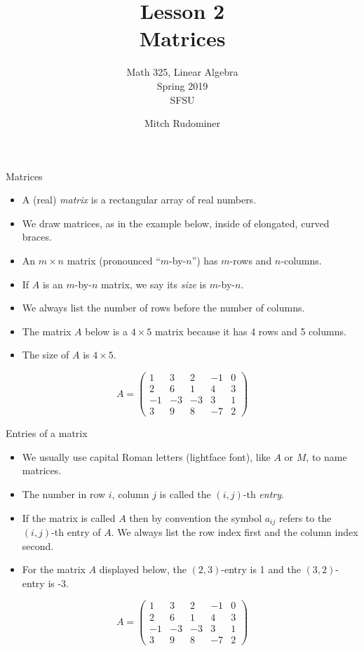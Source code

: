 \documentclass{beamer}
\title{Lesson 2 \\ Matrices}
\subtitle{Math 325, Linear Algebra \\ Spring 2019 \\ SFSU}
\author{Mitch Rudominer}
\date{}
\begin{document}
\begin{frame}
  \titlepage
\end{frame}



\begin{frame}{Matrices}

\begin{itemize}
\item A (real) \emph{matrix} is a rectangular array of real numbers.
\item We draw matrices, as in the example below, inside of elongated, curved
braces.
\item An $m\times n$ matrix (pronounced ``$m$-by-$n$'') has $m$-rows and $n$-columns.
\item If $A$ is an $m$-by-$n$ matrix, we say its \emph{size} is $m$-by-$n$.
\item We always list the number of rows before the number of columns.
\item The matrix $A$ below is a $4\times 5$ matrix because it has 4 rows
and 5 columns.
\item The size of $A$ is $4\times 5$.
\end{itemize}

$$
A =
\begin{pmatrix}
1 & 3 & 2 & -1 & 0 \\
2 & 6 & 1 & 4 & 3\\
-1 & -3 & -3 & 3 & 1 \\
3 & 9 & 8 & -7 & 2
\end{pmatrix}
$$

\end{frame}


\begin{frame}{Entries of a matrix}

\begin{itemize}
\item We usually use capital Roman letters (lightface font), like $A$ or $M$, to name matrices.
\item The number in row $i$, column $j$ is called the $(i,j)$-th \emph{entry}.
\item If the matrix is called $A$ then by convention the symbol $a_{ij}$ refers
to the $(i,j)$-th entry of $A$.
We always list the row index first and the column index second.
\item For the matrix $A$ displayed below, the $(2,3)$-entry is 1 and the
$(3,2)$-entry is -3.
\end{itemize}

$$
A =
\begin{pmatrix}
1 & 3 & 2 & -1 & 0 \\
2 & 6 & 1 & 4 & 3\\
-1 & -3 & -3 & 3 & 1 \\
3 & 9 & 8 & -7 & 2
\end{pmatrix}
$$

\end{frame}
\end{document}
